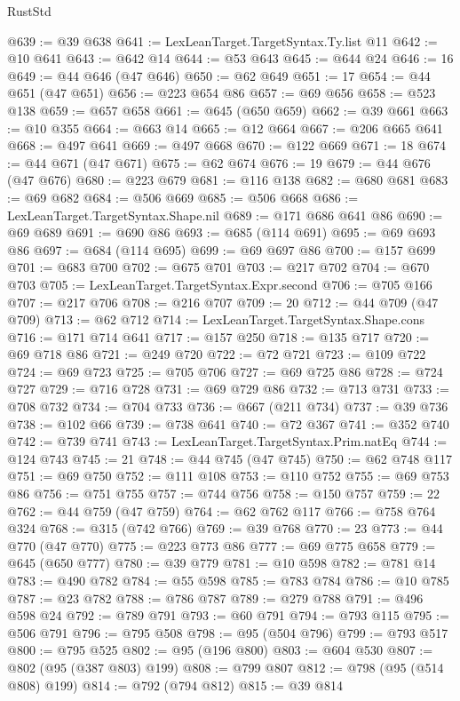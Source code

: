 \begin{lexlean}{RustStd}
\begin{coremodule}
@639 := @39 @638
@641 := LexLeanTarget.TargetSyntax.Ty.list @11
@642 := @10 @641
@643 := @642 @14
@644 := @53 @643
@645 := @644 @24
@646 := 16
@649 := @44 @646 (@47 @646)
@650 := @62 @649
@651 := 17
@654 := @44 @651 (@47 @651)
@656 := @223 @654 @86
@657 := @69 @656
@658 := @523 @138
@659 := @657 @658
@661 := @645 (@650 @659)
@662 := @39 @661
@663 := @10 @355
@664 := @663 @14
@665 := @12 @664
@667 := @206 @665 @641
@668 := @497 @641
@669 := @497 @668
@670 := @122 @669
@671 := 18
@674 := @44 @671 (@47 @671)
@675 := @62 @674
@676 := 19
@679 := @44 @676 (@47 @676)
@680 := @223 @679
@681 := @116 @138
@682 := @680 @681
@683 := @69 @682
@684 := @506 @669
@685 := @506 @668
@686 := LexLeanTarget.TargetSyntax.Shape.nil
@689 := @171 @686 @641 @86
@690 := @69 @689
@691 := @690 @86
@693 := @685 (@114 @691)
@695 := @69 @693 @86
@697 := @684 (@114 @695)
@699 := @69 @697 @86
@700 := @157 @699
@701 := @683 @700
@702 := @675 @701
@703 := @217 @702
@704 := @670 @703
@705 := LexLeanTarget.TargetSyntax.Expr.second
@706 := @705 @166
@707 := @217 @706
@708 := @216 @707
@709 := 20
@712 := @44 @709 (@47 @709)
@713 := @62 @712
@714 := LexLeanTarget.TargetSyntax.Shape.cons
@716 := @171 @714 @641
@717 := @157 @250
@718 := @135 @717
@720 := @69 @718 @86
@721 := @249 @720
@722 := @72 @721
@723 := @109 @722
@724 := @69 @723
@725 := @705 @706
@727 := @69 @725 @86
@728 := @724 @727
@729 := @716 @728
@731 := @69 @729 @86
@732 := @713 @731
@733 := @708 @732
@734 := @704 @733
@736 := @667 (@211 @734)
@737 := @39 @736
@738 := @102 @66
@739 := @738 @641
@740 := @72 @367
@741 := @352 @740
@742 := @739 @741
@743 := LexLeanTarget.TargetSyntax.Prim.natEq
@744 := @124 @743
@745 := 21
@748 := @44 @745 (@47 @745)
@750 := @62 @748 @117
@751 := @69 @750
@752 := @111 @108
@753 := @110 @752
@755 := @69 @753 @86
@756 := @751 @755
@757 := @744 @756
@758 := @150 @757
@759 := 22
@762 := @44 @759 (@47 @759)
@764 := @62 @762 @117
@766 := @758 @764 @324
@768 := @315 (@742 @766)
@769 := @39 @768
@770 := 23
@773 := @44 @770 (@47 @770)
@775 := @223 @773 @86
@777 := @69 @775 @658
@779 := @645 (@650 @777)
@780 := @39 @779
@781 := @10 @598
@782 := @781 @14
@783 := @490 @782
@784 := @55 @598
@785 := @783 @784
@786 := @10 @785
@787 := @23 @782
@788 := @786 @787
@789 := @279 @788
@791 := @496 @598 @24
@792 := @789 @791
@793 := @60 @791
@794 := @793 @115
@795 := @506 @791
@796 := @795 @508
@798 := @95 (@504 @796)
@799 := @793 @517
@800 := @795 @525
@802 := @95 (@196 @800)
@803 := @604 @530
@807 := @802 (@95 (@387 @803) @199)
@808 := @799 @807
@812 := @798 (@95 (@514 @808) @199)
@814 := @792 (@794 @812)
@815 := @39 @814

\end{coremodule}
\end{lexlean}
